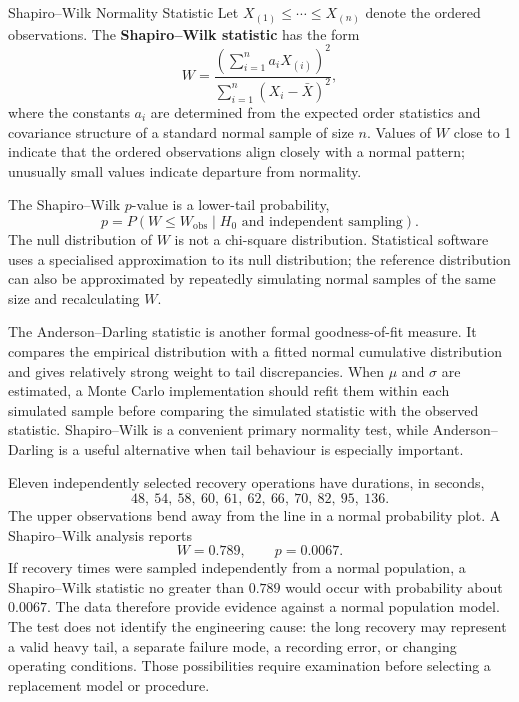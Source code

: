 \begin{definition}{Shapiro--Wilk Normality Statistic}
Let $X_{(1)}\leq\cdots\leq X_{(n)}$ denote the ordered observations. The \textbf{Shapiro--Wilk statistic} has the form
\[
W
=
\frac{\left(\sum_{i=1}^{n}a_iX_{(i)}\right)^2}
     {\sum_{i=1}^{n}(X_i-\bar X)^2},
\]
where the constants $a_i$ are determined from the expected order statistics and covariance structure of a standard normal sample of size $n$. Values of $W$ close to 1 indicate that the ordered observations align closely with a normal pattern; unusually small values indicate departure from normality.
\end{definition}

The Shapiro--Wilk $p$-value is a lower-tail probability,
\[
p=P(W\leq W_{\mathrm{obs}}\mid H_0\text{ and independent sampling}).
\]
The null distribution of $W$ is not a chi-square distribution. Statistical software uses a specialised approximation to its null distribution; the reference distribution can also be approximated by repeatedly simulating normal samples of the same size and recalculating $W$.

The Anderson--Darling statistic is another formal goodness-of-fit measure. It compares the empirical distribution with a fitted normal cumulative distribution and gives relatively strong weight to tail discrepancies. When $\mu$ and $\sigma$ are estimated, a Monte Carlo implementation should refit them within each simulated sample before comparing the simulated statistic with the observed statistic. Shapiro--Wilk is a convenient primary normality test, while Anderson--Darling is a useful alternative when tail behaviour is especially important.

\begin{example}\par
Eleven independently selected recovery operations have durations, in seconds,
\[
48,\ 54,\ 58,\ 60,\ 61,\ 62,\ 66,\ 70,\ 82,\ 95,\ 136.
\]
The upper observations bend away from the line in a normal probability plot. A Shapiro--Wilk analysis reports
\[
W=0.789,
\qquad
p=0.0067.
\]
If recovery times were sampled independently from a normal population, a Shapiro--Wilk statistic no greater than $0.789$ would occur with probability about $0.0067$. The data therefore provide evidence against a normal population model. The test does not identify the engineering cause: the long recovery may represent a valid heavy tail, a separate failure mode, a recording error, or changing operating conditions. Those possibilities require examination before selecting a replacement model or procedure.
\end{example}

